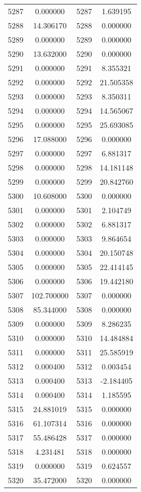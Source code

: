 \documentclass[12pt]{article}
\begin{document}
\begin{longtable}{@{}cccc@{}}
5287 & 0.000000 & 5287 & 1.639195 \\
5288 & 14.306170 & 5288 & 0.000000 \\
5289 & 0.000000 & 5289 & 0.000000 \\
5290 & 13.632000 & 5290 & 0.000000 \\
5291 & 0.000000 & 5291 & 8.355321 \\
5292 & 0.000000 & 5292 & 21.505358 \\
5293 & 0.000000 & 5293 & 8.350311 \\
5294 & 0.000000 & 5294 & 14.565067 \\
5295 & 0.000000 & 5295 & 25.693085 \\
5296 & 17.088000 & 5296 & 0.000000 \\
5297 & 0.000000 & 5297 & 6.881317 \\
5298 & 0.000000 & 5298 & 14.181148 \\
5299 & 0.000000 & 5299 & 20.842760 \\
5300 & 10.608000 & 5300 & 0.000000 \\
5301 & 0.000000 & 5301 & 2.104749 \\
5302 & 0.000000 & 5302 & 6.881317 \\
5303 & 0.000000 & 5303 & 9.864654 \\
5304 & 0.000000 & 5304 & 20.150748 \\
5305 & 0.000000 & 5305 & 22.414145 \\
5306 & 0.000000 & 5306 & 19.442180 \\
5307 & 102.700000 & 5307 & 0.000000 \\
5308 & 85.344000 & 5308 & 0.000000 \\
5309 & 0.000000 & 5309 & 8.286235 \\
5310 & 0.000000 & 5310 & 14.484884 \\
5311 & 0.000000 & 5311 & 25.585919 \\
5312 & 0.000400 & 5312 & 0.003454 \\
5313 & 0.000400 & 5313 & -2.184405 \\
5314 & 0.000400 & 5314 & 1.185595 \\
5315 & 24.881019 & 5315 & 0.000000 \\
5316 & 61.107314 & 5316 & 0.000000 \\
5317 & 55.486428 & 5317 & 0.000000 \\
5318 & 4.231481 & 5318 & 0.000000 \\
5319 & 0.000000 & 5319 & 0.624557 \\
5320 & 35.472000 & 5320 & 0.000000 \\

\end{longtable}
\end{document}
